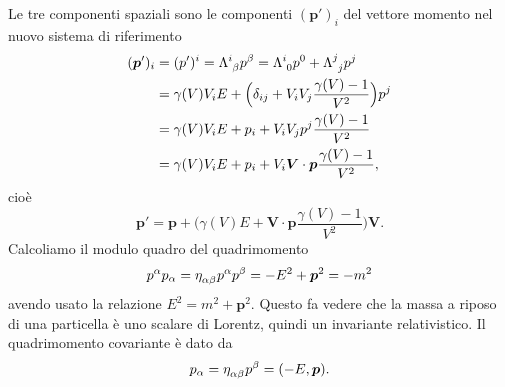 Le tre componenti spaziali sono le componenti $(\bm{p}')_{i}$ del vettore
momento nel nuovo sistema di riferimento
\begin{equation}
  \begin{split}
    (\bm{p}')_{i} &= (p')^{i} = \tensor{\Lambda}{^{i}_{\beta}}p^{\beta} =
    \tensor{\Lambda}{^{i}_{0}}p^{0} + \tensor{\Lambda}{^{j}_{j}}p^{j} \\
    &= \gamma(V) V_{i}E + \Big( \delta_{ij} +
    V_{i}V_{j}\frac{\gamma(V)-1}{V^{2}}\Big)p^{j} \\
    &= \gamma(V) V_{i}E + p_{i} +
    V_{i}V_{j}p^{j}\frac{\gamma(V)-1}{V^{2}} \\
    &= \gamma(V) V_{i}E + p_{i} + V_{i} \bm{V} \cdot \bm{p}
    \frac{\gamma(V)-1}{V^{2}},
  \end{split}
\end{equation}
cioè
\begin{equation}
  \bm{p}' = \bm{p} + \Big(\gamma(V) E + \bm{V} \cdot \bm{p}
  \frac{\gamma(V)-1}{V^{2}}\Big)\bm{V}.
\end{equation}
Calcoliamo il modulo quadro del quadrimomento
\begin{equation}
  p^{\alpha}p_{\alpha} = \tensor{\eta}{_{\alpha\beta}}p^{\alpha}p^{\beta} =
  -E^{2} + \bm{p}^{2} = -m^{2}
\end{equation}
avendo usato la relazione $E^{2} = m^{2} + \bm{p}^{2}$.  Questo fa vedere che la
massa a riposo di una particella è uno scalare di Lorentz, quindi un invariante
relativistico.  Il quadrimomento covariante è dato da
\begin{equation}
  p_{\alpha} = \tensor{\eta}{_{\alpha\beta}}p^{\beta} = (-E, \bm{p}).
\end{equation}

